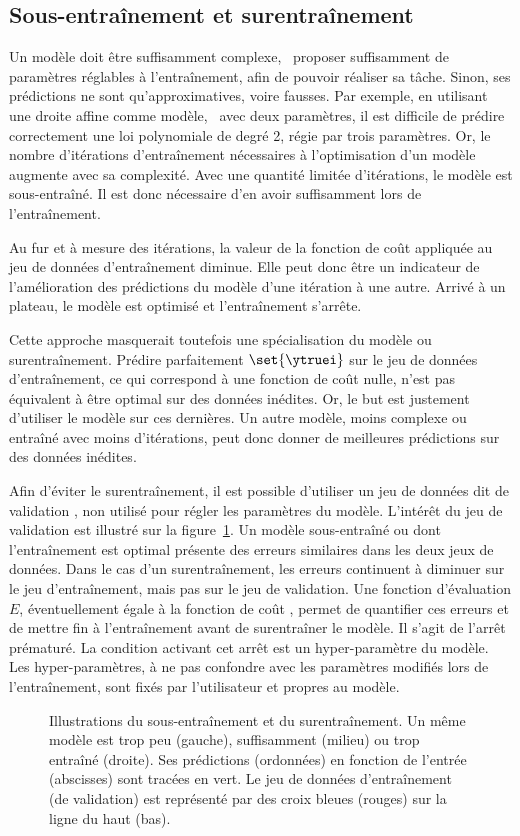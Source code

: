 \subsection{Sous-entraînement et surentraînement}
Un modèle doit être suffisamment complexe,
\ie\ proposer suffisamment de paramètres réglables à l'entraînement,
afin de pouvoir réaliser sa tâche.
Sinon, ses prédictions ne sont qu'approximatives, voire fausses.
Par exemple,
en utilisant une droite affine comme modèle, \ie\ avec deux paramètres,
il est difficile de prédire correctement
une loi polynomiale de degré 2, régie par trois paramètres.
Or, le nombre d'itérations d'entraînement nécessaires à l'optimisation d'un modèle augmente avec sa complexité.
Avec une quantité limitée d'itérations, le modèle est sous-entraîné.
Il est donc nécessaire d'en avoir suffisamment lors de l'entraînement.
\par
Au fur et à mesure des itérations,
la valeur de la fonction de coût appliquée au jeu de données d'entraînement diminue.
Elle peut donc être un indicateur de l'amélioration des prédictions du modèle d'une itération à une autre.
Arrivé à un plateau, le modèle est optimisé et l'entraînement s'arrête.
\par
Cette approche masquerait toutefois une spécialisation du modèle ou surentraînement.
Prédire parfaitement $\set{\ytruei}$ sur le jeu de données d'entraînement,
ce qui correspond à une fonction de coût nulle,
n'est pas équivalent à être optimal sur des données inédites.
Or, le but est justement d'utiliser le modèle sur ces dernières.
Un autre modèle, moins complexe ou entraîné avec moins d'itérations,
peut donc donner de meilleures prédictions sur des données inédites.
\par
Afin d'éviter le surentraînement,
il est possible d'utiliser un jeu de données dit de \og validation \fg,
non utilisé pour régler les paramètres du modèle.
L'intérêt du jeu de validation est illustré sur la figure~\ref{fig-underfitting_and_overfitting}.
Un modèle sous-entraîné ou dont l'entraînement est optimal présente des erreurs similaires dans les deux jeux de données.
Dans le cas d'un surentraînement, les erreurs continuent à diminuer sur le jeu d'entraînement, mais pas sur le jeu de validation.
Une fonction d'évaluation $E$, éventuellement égale à la fonction de coût \Loss, permet de quantifier ces erreurs et de mettre fin à l'entraînement avant de surentraîner le modèle.
Il s'agit de l'arrêt prématuré.
La condition activant cet arrêt est un \og hyper-paramètre \fg{} du modèle.
Les hyper-paramètres,
à ne pas confondre avec les paramètres modifiés lors de l'entraînement,
sont fixés par l'utilisateur et propres au modèle.
\begin{figure}[h]
\centering

\caption[Illustrations du sous-entraînement et du surentraînement.]{Illustrations du sous-entraînement et du surentraînement.
Un même modèle est trop peu (gauche), suffisamment (milieu) ou trop entraîné (droite). Ses prédictions (ordonnées) en fonction de l'entrée (abscisses) sont tracées en vert.
Le jeu de données d'entraînement (de validation) est représenté par des croix bleues (rouges) sur la ligne du haut (bas).}
\label{fig-underfitting_and_overfitting}
\end{figure}